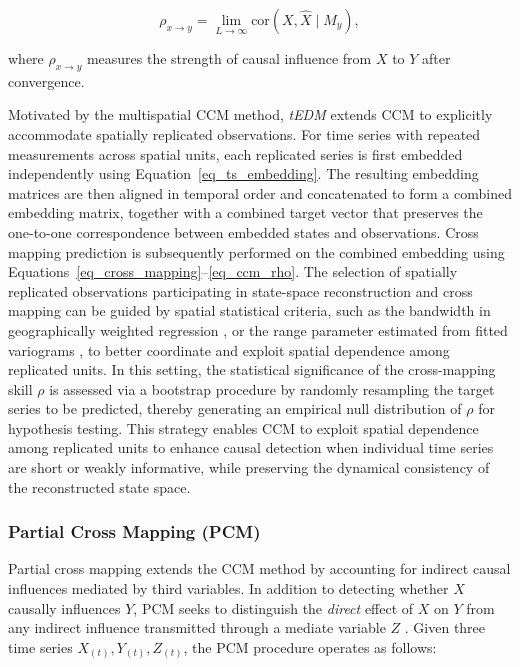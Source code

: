 \documentclass[authoryear,preprint,review,12pt]{elsarticle}
\begin{document}
\begin{equation}\label{eq_ccm_convergence}
\rho_{x \to y} = \lim_{L \to \infty} \mathrm{cor} \left( X, \hat{X} \mid M_y \right),
\end{equation}

\noindent where $\rho_{x \to y}$ measures the strength of causal influence from $X$ to $Y$ after convergence.

Motivated by the multispatial CCM method, \textit{tEDM} extends CCM to explicitly accommodate spatially replicated observations. For time series with repeated measurements across spatial units, each replicated series is first embedded independently using Equation~\ref{eq_ts_embedding}. The resulting embedding matrices are then aligned in temporal order and concatenated to form a combined embedding matrix, together with a combined target vector that preserves the one-to-one correspondence between embedded states and observations. Cross mapping prediction is subsequently performed on the combined embedding using Equations~\ref{eq_cross_mapping}--\ref{eq_ccm_rho}. The selection of spatially replicated observations participating in state-space reconstruction and cross mapping can be guided by spatial statistical criteria, such as the bandwidth in geographically weighted regression \citep{brunsdon1996gwr}, or the range parameter estimated from fitted variograms \citep{webster2007gstat}, to better coordinate and exploit spatial dependence among replicated units. In this setting, the statistical significance of the cross-mapping skill $\rho$ is assessed via a bootstrap procedure by randomly resampling the target series to be predicted, thereby generating an empirical null distribution of $\rho$ for hypothesis testing. This strategy enables CCM to exploit spatial dependence among replicated units to enhance causal detection when individual time series are short or weakly informative, while preserving the dynamical consistency of the reconstructed state space.

\subsubsection{Partial Cross Mapping (PCM)}\label{sec_pcm}

Partial cross mapping extends the CCM method by accounting for indirect causal influences mediated by third variables. In addition to detecting whether $X$ causally influences $Y$, PCM seeks to distinguish the \emph{direct} effect of $X$ on $Y$ from any indirect influence transmitted through a mediate variable $Z$ \citep{leng2020pcm}. Given three time series $X_{(t)}, Y_{(t)}, Z_{(t)}$, the PCM procedure operates as follows:
\end{document}
